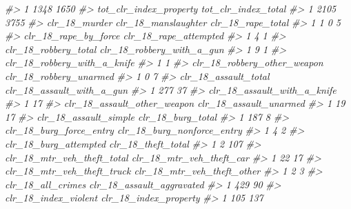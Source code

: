 \documentclass[
  12pt,
  openany]{book}
\newenvironment{Shaded}{\begin{snugshade}}{\end{snugshade}}
\newcommand{\CommentTok}[1]{\textcolor[rgb]{0.37,0.37,0.37}{\textit{#1}}}
\begin{document}
\begin{Shaded}
\begin{Highlighting}[]
\CommentTok{\#\textgreater{} 1                       1348                  1650}
\CommentTok{\#\textgreater{}   tot\_clr\_index\_property tot\_clr\_index\_total}
\CommentTok{\#\textgreater{} 1                   2105                3755}
\CommentTok{\#\textgreater{}   clr\_18\_murder clr\_18\_manslaughter clr\_18\_rape\_total}
\CommentTok{\#\textgreater{} 1             1                   0                 5}
\CommentTok{\#\textgreater{}   clr\_18\_rape\_by\_force clr\_18\_rape\_attempted}
\CommentTok{\#\textgreater{} 1                    4                     1}
\CommentTok{\#\textgreater{}   clr\_18\_robbery\_total clr\_18\_robbery\_with\_a\_gun}
\CommentTok{\#\textgreater{} 1                    9                         1}
\CommentTok{\#\textgreater{}   clr\_18\_robbery\_with\_a\_knife}
\CommentTok{\#\textgreater{} 1                           1}
\CommentTok{\#\textgreater{}   clr\_18\_robbery\_other\_weapon clr\_18\_robbery\_unarmed}
\CommentTok{\#\textgreater{} 1                           0                      7}
\CommentTok{\#\textgreater{}   clr\_18\_assault\_total clr\_18\_assault\_with\_a\_gun}
\CommentTok{\#\textgreater{} 1                  277                        37}
\CommentTok{\#\textgreater{}   clr\_18\_assault\_with\_a\_knife}
\CommentTok{\#\textgreater{} 1                          17}
\CommentTok{\#\textgreater{}   clr\_18\_assault\_other\_weapon clr\_18\_assault\_unarmed}
\CommentTok{\#\textgreater{} 1                          19                     17}
\CommentTok{\#\textgreater{}   clr\_18\_assault\_simple clr\_18\_burg\_total}
\CommentTok{\#\textgreater{} 1                   187                 8}
\CommentTok{\#\textgreater{}   clr\_18\_burg\_force\_entry clr\_18\_burg\_nonforce\_entry}
\CommentTok{\#\textgreater{} 1                       4                          2}
\CommentTok{\#\textgreater{}   clr\_18\_burg\_attempted clr\_18\_theft\_total}
\CommentTok{\#\textgreater{} 1                     2                107}
\CommentTok{\#\textgreater{}   clr\_18\_mtr\_veh\_theft\_total clr\_18\_mtr\_veh\_theft\_car}
\CommentTok{\#\textgreater{} 1                         22                       17}
\CommentTok{\#\textgreater{}   clr\_18\_mtr\_veh\_theft\_truck clr\_18\_mtr\_veh\_theft\_other}
\CommentTok{\#\textgreater{} 1                          2                          3}
\CommentTok{\#\textgreater{}   clr\_18\_all\_crimes clr\_18\_assault\_aggravated}
\CommentTok{\#\textgreater{} 1               429                        90}
\CommentTok{\#\textgreater{}   clr\_18\_index\_violent clr\_18\_index\_property}
\CommentTok{\#\textgreater{} 1                  105                   137}

\end{Highlighting}
\end{Shaded}
\end{document}
